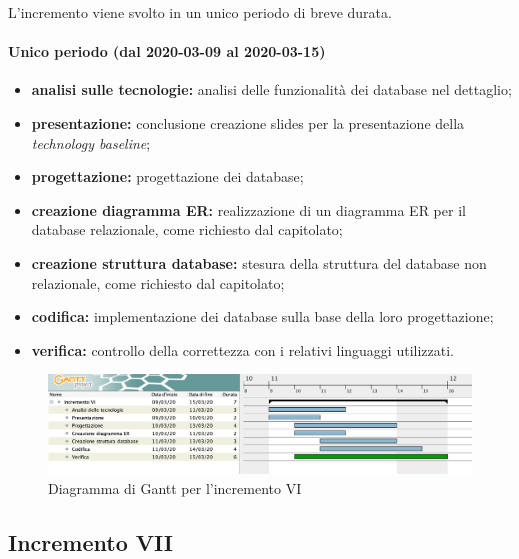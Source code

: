 				L'incremento viene svolto in un unico periodo di breve durata.
				
				\paragraph{Unico periodo (dal 2020-03-09 al 2020-03-15)}
				
					\begin{itemize}
						\item \textbf{analisi sulle tecnologie:} analisi delle funzionalità dei database nel dettaglio;
						\item \textbf{presentazione:} conclusione creazione slides per la presentazione della \textit{technology baseline};
						\item \textbf{progettazione:} progettazione dei database;
						\item \textbf{creazione diagramma ER:} realizzazione di un diagramma ER per il database relazionale, come richiesto dal capitolato;
						\item \textbf{creazione struttura database:} stesura della struttura del database non relazionale, come richiesto dal capitolato;
						\item \textbf{codifica:} implementazione dei database sulla base della loro progettazione;
						\item \textbf{verifica:} controllo della correttezza con i relativi linguaggi utilizzati.
					\end{itemize} 			

		\begin{landscape}
          \begin{figure}[H]
            \centering
            \includegraphics[width=\linewidth]{images/gantt/incrementoVI} %
            \caption{Diagramma di Gantt per l'incremento VI}
          \end{figure}		
		\end{landscape}


		\subsection{Incremento VII}
			

